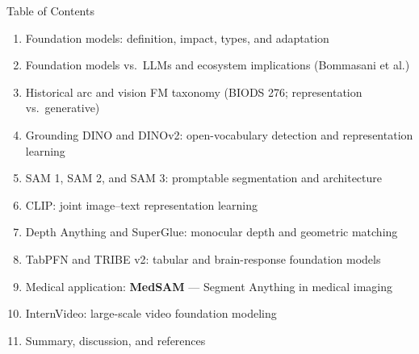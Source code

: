 \begin{frame}{Table of Contents}
  \begin{enumerate}\itemsep0.15em
    \item Foundation models: definition, impact, types, and adaptation
    \item Foundation models vs.\ LLMs and ecosystem implications (Bommasani et al.)
    \item Historical arc and vision FM taxonomy (BIODS 276; representation vs.\ generative)
    \item Grounding DINO and DINOv2: open-vocabulary detection and representation learning
    \item SAM 1, SAM 2, and SAM 3: promptable segmentation and architecture
    \item CLIP: joint image--text representation learning
    \item Depth Anything and SuperGlue: monocular depth and geometric matching
    \item TabPFN and TRIBE v2: tabular and brain-response foundation models
    \item Medical application: \textbf{MedSAM} --- Segment Anything in medical imaging
    \item InternVideo: large-scale video foundation modeling
    \item Summary, discussion, and references
  \end{enumerate}
\end{frame}
